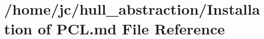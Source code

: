 \hypertarget{_installation_01of_01_p_c_l_8md}{}\section{/home/jc/hull\+\_\+abstraction/\+Installation of P\+C\+L.\+md File Reference}
\label{_installation_01of_01_p_c_l_8md}
